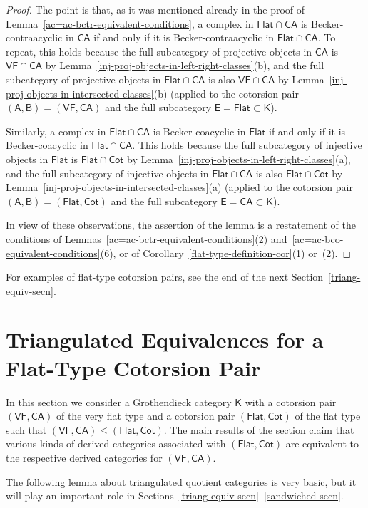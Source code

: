 \documentclass[12pt,a4paper]{amsart}
\newcommand{\+}{\nobreakdash-}
\renewcommand{\:}{\colon}
\newcommand{\sA}{\mathsf A}
\newcommand{\sB}{\mathsf B}
\newcommand{\sE}{\mathsf E}
\newcommand{\sK}{\mathsf K}
\newcommand{\VF}{\mathsf{VF}}
\newcommand{\CA}{\mathsf{CA}}
\newcommand{\Flat}{\mathsf{Flat}}
\newcommand{\Cot}{\mathsf{Cot}}
\newcommand{\Section}[1]{\bigskip\section{#1}\medskip}
\theoremstyle{plain}
\theoremstyle{definition}
\begin{document}
\begin{proof}
 The point is that, as it was mentioned already in the proof of
Lemma~\ref{ac=ac-bctr-equivalent-conditions}, a complex in
$\Flat\cap\CA$ is Becker-contraacyclic in $\CA$ if and only if it is
Becker-contraacyclic in $\Flat\cap\CA$.
 To repeat, this holds because the full subcategory of projective
objects in $\CA$ is $\VF\cap\CA$ by
Lemma~\ref{inj-proj-objects-in-left-right-classes}(b), and the full
subcategory of projective objects in $\Flat\cap\CA$ is also
$\VF\cap\CA$ by Lemma~\ref{inj-proj-objects-in-intersected-classes}(b)
(applied to the cotorsion pair $(\sA,\sB)=(\VF,\CA)$ and the full
subcategory $\sE=\Flat\subset\sK$).

 Similarly, a complex in $\Flat\cap\CA$ is Becker-coacyclic in $\Flat$
if and only if it is Becker-coacyclic in $\Flat\cap\CA$.
 This holds because the full subcategory of injective objects in $\Flat$
is $\Flat\cap\Cot$ by
Lemma~\ref{inj-proj-objects-in-left-right-classes}(a), and the full
subcategory of injective objects in $\Flat\cap\CA$ is also
$\Flat\cap\Cot$
by Lemma~\ref{inj-proj-objects-in-intersected-classes}(a)
(applied to the cotorsion pair $(\sA,\sB)=(\Flat,\Cot)$ and the full
subcategory $\sE=\CA\subset\sK$).

 In view of these observations, the assertion of the lemma is
a restatement of the conditions of
Lemmas~\ref{ac=ac-bctr-equivalent-conditions}(2)
and~\ref{ac=ac-bco-equivalent-conditions}(6), or of
Corollary~\ref{flat-type-definition-cor}(1) or~(2).
\end{proof}

 For examples of flat-type cotorsion pairs, see the end of the next
Section~\ref{triang-equiv-secn}.


\Section{Triangulated Equivalences for a Flat-Type Cotorsion Pair}
\label{triang-equiv-secn}

 In this section we consider a Grothendieck category $\sK$ with
a cotorsion pair $(\VF,\CA)$ of the very flat type and a cotorsion pair
$(\Flat,\Cot)$ of the flat type such that $(\VF,\CA)\le(\Flat,\Cot)$.
 The main results of the section claim that various kinds of
derived categories associated with $(\Flat,\Cot)$ are equivalent to
the respective derived categories for $(\VF,\CA)$.

 The following lemma about triangulated quotient categories is very
basic, but it will play an important role in
Sections~\ref{triang-equiv-secn}\+-\ref{sandwiched-secn}.
\end{document}
